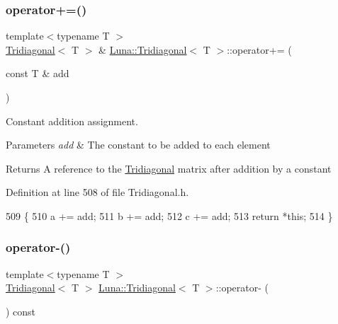 \subsubsection{\texorpdfstring{operator+=()}{operator+=()}\hspace{0.1cm}{\footnotesize\ttfamily [2/2]}}
{\footnotesize\ttfamily template$<$typename T $>$ \\
\hyperlink{classLuna_1_1Tridiagonal}{Tridiagonal}$<$ T $>$ \& \hyperlink{classLuna_1_1Tridiagonal}{Luna\+::\+Tridiagonal}$<$ T $>$\+::operator+= (\begin{DoxyParamCaption}\item[{const T \&}]{add }\end{DoxyParamCaption})\hspace{0.3cm}{\ttfamily [inline]}}



Constant addition assignment. 


\begin{DoxyParams}{Parameters}
{\em add} & The constant to be added to each element \\
\hline
\end{DoxyParams}
\begin{DoxyReturn}{Returns}
A reference to the \hyperlink{classLuna_1_1Tridiagonal}{Tridiagonal} matrix after addition by a constant 
\end{DoxyReturn}


Definition at line 508 of file Tridiagonal.\+h.


\begin{DoxyCode}
509   \{
510     a += add;
511     b += add;
512     c += add;
513     \textcolor{keywordflow}{return} *\textcolor{keyword}{this};
514   \}
\end{DoxyCode}
\mbox{\label{classLuna_1_1Tridiagonal_a7f92f3637e30a2fcc12fa959e00eefa0}} 
\subsubsection{\texorpdfstring{operator-\/()}{operator-()}\hspace{0.1cm}{\footnotesize\ttfamily [1/2]}}
{\footnotesize\ttfamily template$<$typename T $>$ \\
\hyperlink{classLuna_1_1Tridiagonal}{Tridiagonal}$<$ T $>$ \hyperlink{classLuna_1_1Tridiagonal}{Luna\+::\+Tridiagonal}$<$ T $>$\+::operator-\/ (\begin{DoxyParamCaption}{ }\end{DoxyParamCaption}) const\hspace{0.3cm}{\ttfamily [inline]}}



